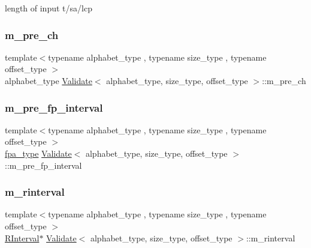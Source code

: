 length of input t/sa/lcp 

\mbox{\label{class_validate_abc933d4475a6b952888ee423c3228fc9}} 
\subsubsection{\texorpdfstring{m\+\_\+pre\+\_\+ch}{m\_pre\_ch}}
{\footnotesize\ttfamily template$<$typename alphabet\+\_\+type , typename size\+\_\+type , typename offset\+\_\+type $>$ \\
alphabet\+\_\+type \hyperlink{class_validate}{Validate}$<$ alphabet\+\_\+type, size\+\_\+type, offset\+\_\+type $>$\+::m\+\_\+pre\+\_\+ch\hspace{0.3cm}{\ttfamily [private]}}

\mbox{\label{class_validate_a767b5f07008091d4191201c07ad9a3cd}} 
\subsubsection{\texorpdfstring{m\+\_\+pre\+\_\+fp\+\_\+interval}{m\_pre\_fp\_interval}}
{\footnotesize\ttfamily template$<$typename alphabet\+\_\+type , typename size\+\_\+type , typename offset\+\_\+type $>$ \\
\hyperlink{common_8h_a7fdaf8b9b3d2f6ae6b10597a8d3f96ee}{fpa\+\_\+type} \hyperlink{class_validate}{Validate}$<$ alphabet\+\_\+type, size\+\_\+type, offset\+\_\+type $>$\+::m\+\_\+pre\+\_\+fp\+\_\+interval\hspace{0.3cm}{\ttfamily [private]}}

\mbox{\label{class_validate_aaa32f94ddccccccd3d86897996c323cc}} 
\subsubsection{\texorpdfstring{m\+\_\+rinterval}{m\_rinterval}}
{\footnotesize\ttfamily template$<$typename alphabet\+\_\+type , typename size\+\_\+type , typename offset\+\_\+type $>$ \\
\hyperlink{struct_validate_1_1_r_interval}{R\+Interval}$\ast$ \hyperlink{class_validate}{Validate}$<$ alphabet\+\_\+type, size\+\_\+type, offset\+\_\+type $>$\+::m\+\_\+rinterval\hspace{0.3cm}{\ttfamily [private]}}

